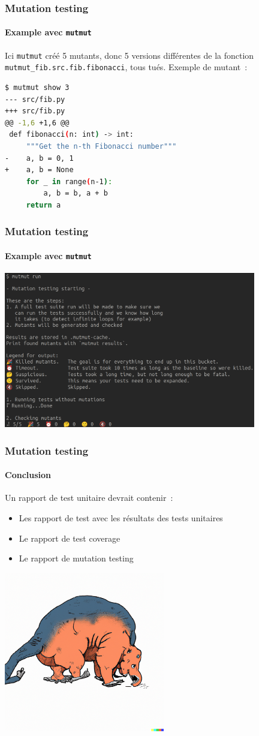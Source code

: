 \documentclass{beamer}
\begin{document}
    \begin{frame}[fragile]
        \frametitle{Mutation testing}
        \framesubtitle{Example avec \lstinline{mutmut}}
        \transdissolve
        Ici \lstinline{mutmut} créé 5 mutants, donc 5 versions différentes de la fonction \lstinline{mutmut_fib.src.fib.fibonacci}, tous tués.
        \bigbreak
        Exemple de mutant~:
        \begin{lstlisting}[language=bash]
$ mutmut show 3
--- src/fib.py
+++ src/fib.py
@@ -1,6 +1,6 @@
 def fibonacci(n: int) -> int:
     """Get the n-th Fibonacci number"""
-    a, b = 0, 1
+    a, b = None
     for _ in range(n-1):
         a, b = b, a + b
     return a
        \end{lstlisting}
    \end{frame}

    \begin{frame}
        \frametitle{Mutation testing}
        \framesubtitle{Example avec \lstinline{mutmut}}
        \transdissolve
        \centering
        \includegraphics[width=11cm]{image/mutmut-result}
    \end{frame}

    \begin{frame}
        \frametitle{Mutation testing}
        \framesubtitle{Conclusion}
        \transdissolve
        Un rapport de test unitaire devrait contenir~:
        \begin{itemize}
            \item Les rapport de test avec les résultats des tests unitaires
            \item Le rapport de test coverage
            \item Le rapport de mutation testing
        \end{itemize}
        \centering
        \includegraphics[width=7cm]{image/mutant}
    \end{frame}
\end{document}
